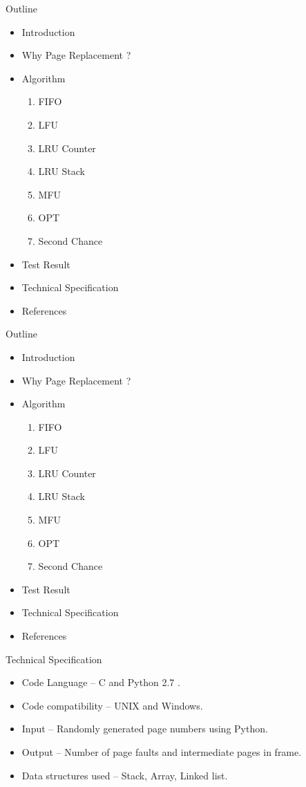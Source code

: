 \documentclass{beamer}
\begin{document}
\begin{frame}{Outline}
	\begin{itemize}
		\item Introduction
		\item Why Page Replacement ?
		\item Algorithm
		
		\begin{enumerate}
			\item FIFO
			\item LFU
			\item LRU Counter
			\item LRU Stack
			\item MFU
			\item OPT
			\item Second Chance
		\end{enumerate}
		\item \alert{Test Result}
		\item Technical Specification
		\item References
	\end{itemize}
\end{frame}	


\begin{frame}{Outline}
	\begin{itemize}
		\item Introduction
		\item Why Page Replacement ?
		\item Algorithm
		
		\begin{enumerate}
			\item FIFO
			\item LFU
			\item LRU Counter
			\item LRU Stack
			\item MFU
			\item OPT
			\item Second Chance
		\end{enumerate}
		\item Test Result
		\item \alert{Technical Specification}
		\item References
	\end{itemize}
\end{frame}	



\begin{frame}{Technical Specification}
	\begin{itemize}
		\item Code Language – C and Python 2.7 .
		\item Code compatibility – UNIX and Windows.
		\item Input – Randomly generated page numbers using Python.
		\item Output – Number of page faults and intermediate pages in frame.
		\item Data structures used – Stack, Array, Linked list.
	\end{itemize}
\end{frame}
\end{document}
